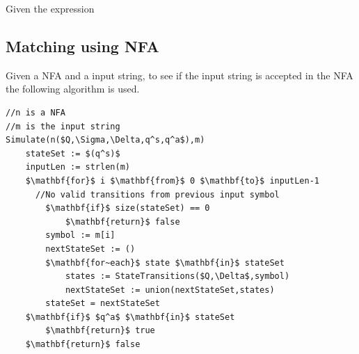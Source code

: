 \begin{myex}
Given the expression 
\end{myex}

%




\subsection{Matching using NFA}
Given a NFA and a input string, to see if the input string is accepted in the NFA the following algorithm is used.
\begin{lstlisting}[mathescape]
//n is a NFA
//m is the input string
Simulate(n($Q,\Sigma,\Delta,q^s,q^a$),m)
    stateSet := $(q^s)$
    inputLen := strlen(m)
    $\mathbf{for}$ i $\mathbf{from}$ 0 $\mathbf{to}$ inputLen-1
      //No valid transitions from previous input symbol
        $\mathbf{if}$ size(stateSet) == 0
            $\mathbf{return}$ false 
        symbol := m[i]
        nextStateSet := ()
        $\mathbf{for~each}$ state $\mathbf{in}$ stateSet
            states := StateTransitions($Q,\Delta$,symbol)
            nextStateSet := union(nextStateSet,states)
        stateSet = nextStateSet
    $\mathbf{if}$ $q^a$ $\mathbf{in}$ stateSet
        $\mathbf{return}$ true
    $\mathbf{return}$ false
\end{lstlisting}



